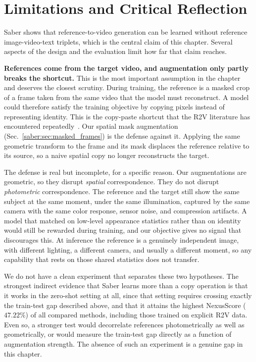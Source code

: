 \section{Limitations and Critical Reflection}
\label{saber:sec:limitations}
Saber shows that reference-to-video generation can be learned without reference image-video-text triplets, which is the central claim of this chapter. Several aspects of the design and the evaluation limit how far that claim reaches.

\noindent \textbf{References come from the target video, and augmentation only partly breaks the shortcut.}
This is the most important assumption in the chapter and deserves the closest scrutiny. During training, the reference is a masked crop of a frame taken from the same video that the model must reconstruct. A model could therefore satisfy the training objective by copying pixels instead of representing identity. This is the copy-paste shortcut that the R2V literature has encountered repeatedly~\citep{liu2025phantom, fei2025skyreels, hu2025hunyuancustom}. Our spatial mask augmentation (Sec.~\ref{saber:sec:masked_frames}) is the defense against it. Applying the same geometric transform to the frame and its mask displaces the reference relative to its source, so a naive spatial copy no longer reconstructs the target.

The defense is real but incomplete, for a specific reason. Our augmentations are geometric, so they disrupt \emph{spatial} correspondence. They do not disrupt \emph{photometric} correspondence. The reference and the target still show the same subject at the same moment, under the same illumination, captured by the same camera with the same color response, sensor noise, and compression artifacts. A model that matched on low-level appearance statistics rather than on identity would still be rewarded during training, and our objective gives no signal that discourages this. At inference the reference is a genuinely independent image, with different lighting, a different camera, and usually a different moment, so any capability that rests on those shared statistics does not transfer.

We do not have a clean experiment that separates these two hypotheses. The strongest indirect evidence that Saber learns more than a copy operation is that it works in the zero-shot setting at all, since that setting requires crossing exactly the train-test gap described above, and that it attains the highest NexusScore ($47.22\%$) of all compared methods, including those trained on explicit R2V data. Even so, a stronger test would decorrelate references photometrically as well as geometrically, or would measure the train-test gap directly as a function of augmentation strength. The absence of such an experiment is a genuine gap in this chapter.

